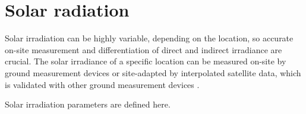 \section{Solar radiation} \label{Solar radiation}
Solar irradiation can be highly variable, depending on the location, so accurate on-site measurement and differentiation of direct and indirect irradiance are crucial. The solar irradiance of a specific location can be measured on-site by ground measurement devices or site-adapted by interpolated satellite data, which is validated with other ground measurement devices \cite{Paulescu2013}.

Solar irradiation parameters are defined here.

